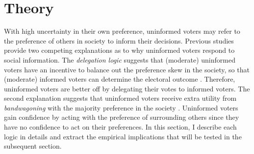 \documentclass[doc,natbib,12pt]{apa6}\usepackage[]{graphicx}\usepackage[]{color}
\begin{document}
    \section{Theory}
    
    \par With high uncertainty in their own preference, uninformed voters may refer to the preference of others in society to inform their decisions. Previous studies provide two competing explanations as to why uninformed voters respond to social information. The \textit{delegation logic} suggests that (moderate) uninformed voters have an incentive to balance out the preference skew in the society, so that (moderate) informed voters can determine the electoral outcome \citep{Feddersen1996thsw}. Therefore, uninformed voters are better off by delegating their votes to informed voters. The second explanation suggests that uninformed voters receive extra utility from \textit{bandwagoning} with the majority preference in the society \citep{Bischoff2013soin}. Uninformed voters gain confidence by acting with the preference of surrounding others since they have no confidence to act on their preferences. In this section, I describe each logic in details and extract the empirical implications that will be tested in the subsequent section. 
    
\end{document}
